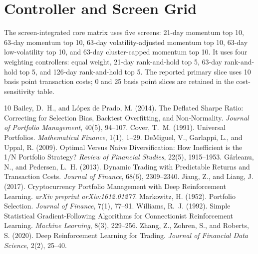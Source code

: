\documentclass[11pt,a4paper]{article}
\begin{document}
\section{Controller and Screen Grid}
The screen-integrated core matrix uses five screens: 21-day momentum top 10, 63-day momentum top 10, 63-day volatility-adjusted momentum top 10, 63-day low-volatility top 10, and 63-day cluster-capped momentum top 10. It uses four weighting controllers: equal weight, 21-day rank-and-hold top 5, 63-day rank-and-hold top 5, and 126-day rank-and-hold top 5. The reported primary slice uses 10 basis point transaction costs; 0 and 25 basis point slices are retained in the cost-sensitivity table.


\begin{thebibliography}{10}
 Bailey, D.~H., and L{\'o}pez de Prado, M. (2014). The Deflated Sharpe Ratio: Correcting for Selection Bias, Backtest Overfitting, and Non-Normality. \textit{Journal of Portfolio Management}, 40(5), 94--107.
 Cover, T.~M. (1991). Universal Portfolios. \textit{Mathematical Finance}, 1(1), 1--29.
 DeMiguel, V., Garlappi, L., and Uppal, R. (2009). Optimal Versus Naive Diversification: How Inefficient is the 1/N Portfolio Strategy? \textit{Review of Financial Studies}, 22(5), 1915--1953.
 G{\^a}rleanu, N., and Pedersen, L.~H. (2013). Dynamic Trading with Predictable Returns and Transaction Costs. \textit{Journal of Finance}, 68(6), 2309--2340.
 Jiang, Z., and Liang, J. (2017). Cryptocurrency Portfolio Management with Deep Reinforcement Learning. \textit{arXiv preprint arXiv:1612.01277}.
 Markowitz, H. (1952). Portfolio Selection. \textit{Journal of Finance}, 7(1), 77--91.
 Williams, R.~J. (1992). Simple Statistical Gradient-Following Algorithms for Connectionist Reinforcement Learning. \textit{Machine Learning}, 8(3), 229--256.
 Zhang, Z., Zohren, S., and Roberts, S. (2020). Deep Reinforcement Learning for Trading. \textit{Journal of Financial Data Science}, 2(2), 25--40.
\end{thebibliography}
\end{document}
